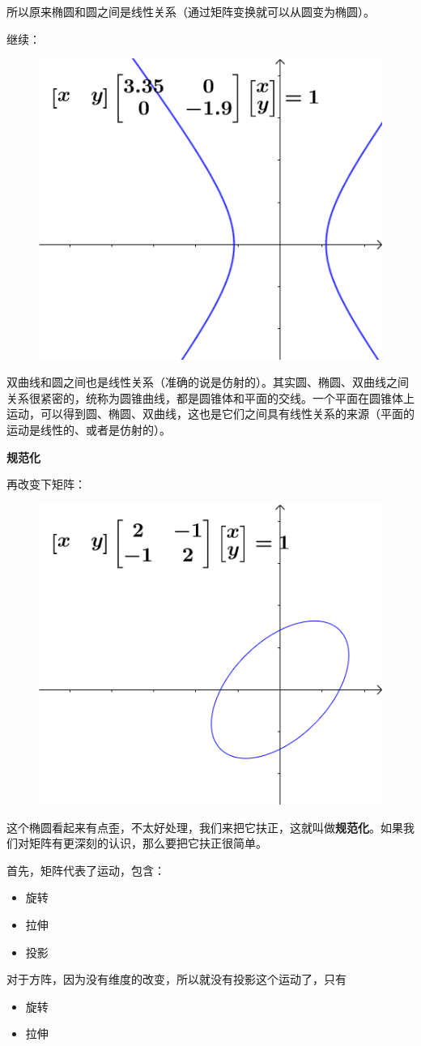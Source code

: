 \documentclass[12pt]{article}
\begin{document}
所以原来椭圆和圆之间是线性关系（通过矩阵变换就可以从圆变为椭圆）。

继续：
\begin{figure}[H]
    \centering
    \includegraphics[width=.3\textwidth]{fig/UnderstandQuadraticForm_5.png}
\end{figure} 
双曲线和圆之间也是线性关系（准确的说是仿射的）。其实圆、椭圆、双曲线之间关系很紧密的，统称为圆锥曲线，都是圆锥体和平面的交线。一个平面在圆锥体上运动，可以得到圆、椭圆、双曲线，这也是它们之间具有线性关系的来源（平面的运动是线性的、或者是仿射的）。

\textbf{规范化}

再改变下矩阵：
\begin{figure}[H]
    \centering
    \includegraphics[width=.3\textwidth]{fig/UnderstandQuadraticForm_6.png}
\end{figure} 

这个椭圆看起来有点歪，不太好处理，我们来把它扶正，这就叫做\textbf{规范化}。如果我们对矩阵有更深刻的认识，那么要把它扶正很简单。

首先，矩阵代表了运动，包含：
\begin{itemize}
\setlength{\itemsep}{0pt}
\setlength{\parsep}{0pt}
\setlength{\parskip}{0pt}
    \item 旋转
    \item 拉伸
    \item 投影
\end{itemize}

对于方阵，因为没有维度的改变，所以就没有投影这个运动了，只有
\begin{itemize}
\setlength{\itemsep}{0pt}
\setlength{\parsep}{0pt}
\setlength{\parskip}{0pt}
    \item 旋转
    \item 拉伸
\end{itemize}
\end{document}
